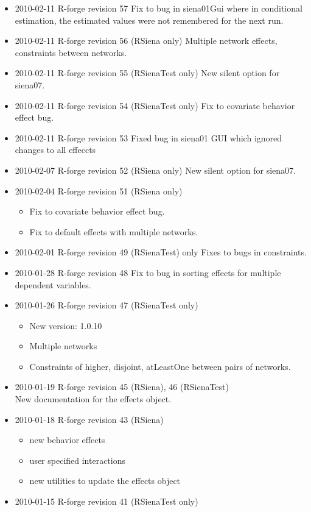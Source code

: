\documentclass[a4paper,fleqn,11pt]{article}
\newcommand{\+}{\, + \,}
\begin{document}
{\begin{small}
\begin{itemize}
\item 2010-02-11 R-forge revision 57 Fix to bug in siena01Gui where in
  conditional estimation, the
  estimated values were not remembered for the next run.
\item 2010-02-11 R-forge revision 56 (RSiena only)
Multiple network effects, constraints between networks.
\item 2010-02-11 R-forge revision 55 (RSienaTest only)
New silent option for siena07.
\item 2010-02-11 R-forge revision 54 (RSienaTest only)
Fix to covariate behavior effect bug.
\item 2010-02-11 R-forge revision 53
Fixed bug in siena01 GUI which ignored changes to all effeccts
\item 2010-02-07 R-forge revision 52 (RSiena only)
New silent option for siena07.
\item 2010-02-04 R-forge revision 51 (RSiena only)
\begin{itemize}
\item
Fix to covariate behavior effect bug.
\item
Fix to default effects with multiple networks.
\end{itemize}
\item 2010-02-01 R-forge revision 49 (RSienaTest) only
Fixes to bugs in constraints.
\item 2010-01-28 R-forge revision 48
Fix to bug in sorting effects for multiple dependent variables.
\item 2010-01-26 R-forge revision 47 (RSienaTest only)
\begin{itemize}
\item New version: 1.0.10
\item Multiple networks
\item Constraints of higher, disjoint, atLeastOne between pairs of networks.
\end{itemize}
\item 2010-01-19 R-forge revision 45 (RSiena), 46 (RSienaTest)\\
 New documentation for the effects object.
\item 2010-01-18 R-forge revision 43 (RSiena)
\begin{itemize}
\item new behavior effects
\item user specified interactions
\item new utilities to update the effects object
\end{itemize}
\item 2010-01-15 R-forge revision 41 (RSienaTest only)


\end{itemize}
\end{small}}
\end{document}
